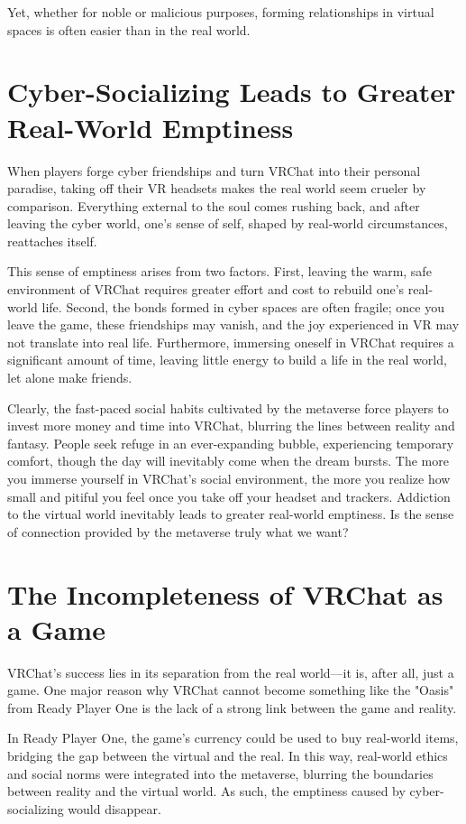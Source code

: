 \documentclass[]{article}
\begin{document}
	Yet, whether for noble or malicious purposes, forming relationships in virtual spaces is often easier than in the real world.
	
	\section{Cyber-Socializing Leads to Greater Real-World Emptiness}
	When players forge cyber friendships and turn VRChat into their personal paradise, taking off their VR headsets makes the real world seem crueler by comparison. Everything external to the soul comes rushing back, and after leaving the cyber world, one’s sense of self, shaped by real-world circumstances, reattaches itself.
	
	This sense of emptiness arises from two factors. First, leaving the warm, safe environment of VRChat requires greater effort and cost to rebuild one's real-world life. Second, the bonds formed in cyber spaces are often fragile; once you leave the game, these friendships may vanish, and the joy experienced in VR may not translate into real life. Furthermore, immersing oneself in VRChat requires a significant amount of time, leaving little energy to build a life in the real world, let alone make friends.
	
	Clearly, the fast-paced social habits cultivated by the metaverse force players to invest more money and time into VRChat, blurring the lines between reality and fantasy. People seek refuge in an ever-expanding bubble, experiencing temporary comfort, though the day will inevitably come when the dream bursts. The more you immerse yourself in VRChat’s social environment, the more you realize how small and pitiful you feel once you take off your headset and trackers. Addiction to the virtual world inevitably leads to greater real-world emptiness. Is the sense of connection provided by the metaverse truly what we want?
	
	\section{The Incompleteness of VRChat as a Game}
	VRChat's success lies in its separation from the real world—it is, after all, just a game. One major reason why VRChat cannot become something like the "Oasis" from Ready Player One is the lack of a strong link between the game and reality.
	
	In Ready Player One, the game's currency could be used to buy real-world items, bridging the gap between the virtual and the real. In this way, real-world ethics and social norms were integrated into the metaverse, blurring the boundaries between reality and the virtual world. As such, the emptiness caused by cyber-socializing would disappear.
	
\end{document}
